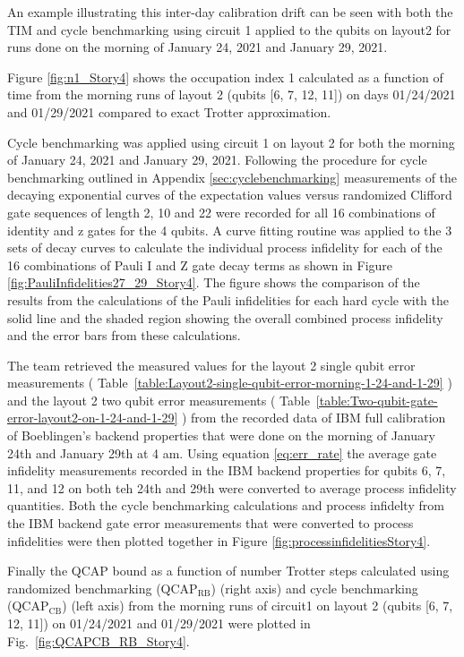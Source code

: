 An example illustrating this inter-day calibration drift can be seen with both the TIM and cycle benchmarking using circuit 1 applied to the qubits on layout2 for runs done on the morning of January 24, 2021 and January 29, 2021.  

Figure \ref{fig:n1_Story4} shows the occupation index 1 calculated as a function of time from the morning runs of layout 2 (qubits [6, 7, 12, 11]) on days 01/24/2021 and 01/29/2021 compared to exact Trotter approximation.  

Cycle benchmarking was applied using circuit 1 on layout 2 for both the morning of January 24, 2021 and January 29, 2021.  Following the procedure for cycle benchmarking outlined in Appendix \ref{sec:cyclebenchmarking} measurements of the decaying exponential curves of the expectation values versus randomized Clifford gate sequences of length 2, 10 and 22 were recorded for all 16 combinations of identity and z gates for the 4 qubits.  A curve fitting routine was applied to the 3 sets of decay curves to calculate the individual process infidelity for each of the 16 combinations of Pauli I and Z gate decay terms as shown in Figure \ref{fig:PauliInfidelities27_29_Story4}.  The figure shows the comparison of the results from the calculations of the Pauli infidelities for each hard cycle with the solid line and the shaded region showing the overall combined process infidelity and the error bars from these calculations. 

The team retrieved the measured values for the layout 2 single qubit error measurements ( Table~\ref{table:Layout2-single-qubit-error-morning-1-24-and-1-29} ) and the layout 2 two qubit error measurements ( Table~\ref{table:Two-qubit-gate-error-layout2-on-1-24-and-1-29} ) from the 
recorded data of IBM full calibration of Boeblingen's backend properties that were done on the morning of January 24th and January 29th at 4 am.   Using equation \eqref{eq:err_rate}
the average gate infidelity measurements recorded in the IBM backend properties for qubits 6, 7, 11, and 12 on both teh 24th and 29th were converted to average process infidelity quantities.  Both the cycle benchmarking calculations and process infidelty from the IBM backend gate error measurements that were converted to process infidelities were then plotted together in Figure \ref{fig:processinfidelitiesStory4}.   

Finally the QCAP bound as a function of number Trotter steps calculated using randomized benchmarking (QCAP$_{\text{RB}}$) (right axis) and cycle benchmarking (QCAP$_{\text{CB}}$) (left axis) from the morning runs of circuit1 on layout 2 (qubits [6, 7, 12, 11]) on 01/24/2021 and 01/29/2021 were plotted in  Fig.~\ref{fig:QCAPCB_RB_Story4}.


